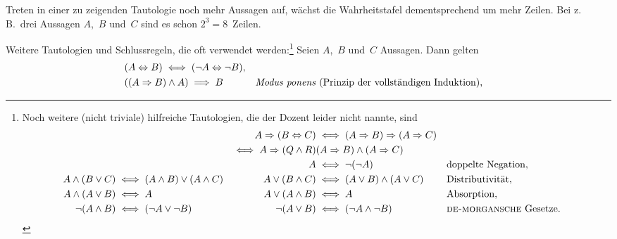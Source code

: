 \documentclass[a4paper]{article}
\begin{document}
Treten in einer zu zeigenden Tautologie noch mehr Aussagen auf, wächst die Wahrheitstafel dementsprechend um mehr Zeilen. Bei z.\,B.\ drei Aussagen $A$,~$B$ und~$C$ sind es schon $2^3 = 8$~Zeilen.

\begin{theorem}\label{thm:logiclaws}
    Weitere Tautologien und Schlussregeln, die oft verwendet werden:\footnote{
        Noch weitere (nicht triviale) hilfreiche Tautologien, die der Dozent leider nicht nannte, sind
        \begin{align*}
                                &                                     & A \Rightarrow (B \Leftrightarrow C) & \iff (A \Rightarrow B) \Rightarrow (A \Rightarrow C)                                             \\
                                &                                     & \iff A \Rightarrow (Q \wedge R)     & (A \Rightarrow B) \wedge (A \Rightarrow C)                                                       \\
                                &                                     & A                                   & \iff \neg (\neg A)                                   &  & \text{doppelte Negation},              \\
            A \wedge (B \vee C) & \iff (A \wedge B) \vee (A \wedge C) & A \vee (B \wedge C)                 & \iff (A \vee B) \wedge (A \vee C)                    &  & \text{Distributivität},                \\
            A \wedge (A \vee B) & \iff A                              & A \vee (A \wedge B)                 & \iff A                                               &  & \text{Absorption},                     \\
            \neg (A \wedge B)   & \iff (\neg A \vee \neg B)           & \neg (A \vee B)                     & \iff (\neg A \wedge \neg B)                          &  & \text{\textsc{de-morgansche} Gesetze}. \\
        \end{align*}
    } Seien $A$,~$B$ und~$C$ Aussagen. Dann gelten
    \begin{align*}
         & (A \Leftrightarrow B) \iff (\neg A \Leftrightarrow \neg B),                                                                                    \\
         & ((A \Rightarrow B) \wedge A) \implies B                                 &  & \text{\emph{Modus ponens} (Prinzip der vollständigen Induktion),} \\

\end{align*}
\end{theorem}
\end{document}
